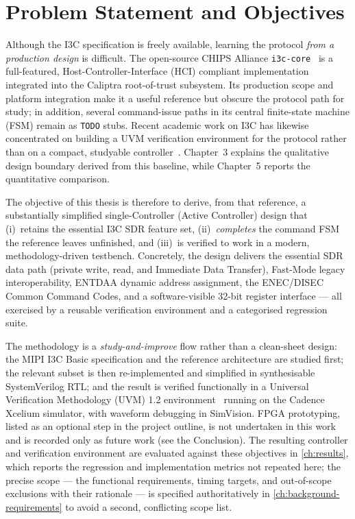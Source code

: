 \section{Problem Statement and Objectives}
\label{sec:intro-problem}

Although the I3C specification is freely available, learning the protocol \emph{from a production design}
is difficult. The open-source CHIPS Alliance \texttt{i3c-core}~\cite{chipsalliance_i3c} is a full-featured,
Host-Controller-Interface (HCI) compliant implementation integrated into the Caliptra root-of-trust
subsystem. Its production scope and platform integration make it a useful reference but obscure the
protocol path for study; in addition, several command-issue paths in its central finite-state machine
(FSM) remain as \texttt{TODO} stubs. Recent academic work on I3C has likewise concentrated on building a
UVM verification environment for the protocol rather than on a compact, studyable
controller~\cite{chauhan_i3c_uvm}. Chapter~3 explains the qualitative design boundary derived from this
baseline, while Chapter~5 reports the quantitative comparison.

The objective of this thesis is therefore to derive, from that reference, a substantially simplified
single-Controller (Active Controller) design that (i)~retains the essential I3C SDR feature set,
(ii)~\emph{completes} the command FSM the reference leaves unfinished, and (iii)~is verified to work in a
modern, methodology-driven testbench. Concretely, the design delivers the essential SDR data path (private
write, read, and Immediate Data Transfer), \iic{} Fast-Mode legacy interoperability, ENTDAA dynamic address
assignment, the ENEC/DISEC Common Command Codes, and a software-visible 32-bit register interface --- all
exercised by a reusable verification environment and a categorised regression suite.

The methodology is a \emph{study-and-improve} flow rather than a clean-sheet design: the MIPI I3C Basic
specification and the reference architecture are studied first; the relevant subset is then re-implemented
and simplified in synthesisable SystemVerilog RTL; and the result is verified functionally in a Universal
Verification Methodology (UVM) 1.2 environment~\cite{uvm12} running on the Cadence Xcelium simulator, with
waveform debugging in SimVision. FPGA prototyping, listed as an optional step in the project outline, is
not undertaken in this work and is recorded only as future work (see the Conclusion). The resulting
controller and verification environment are evaluated against these objectives in \cref{ch:results},
which reports the regression and implementation metrics not repeated here; the precise scope --- the
functional requirements, timing targets, and out-of-scope exclusions with their rationale --- is
specified authoritatively in \cref{ch:background-requirements} to avoid a second, conflicting scope list.

